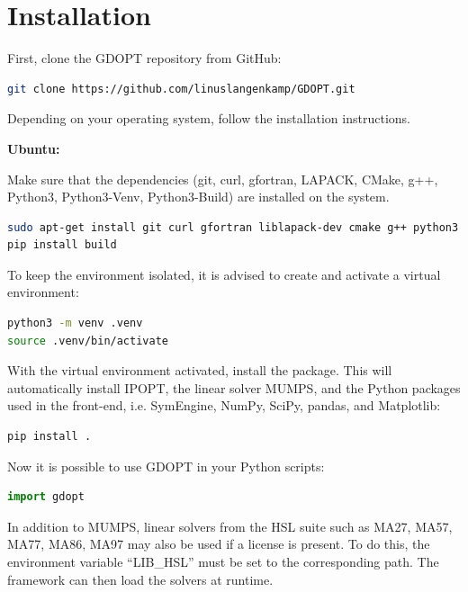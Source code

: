 \documentclass[12pt]{article}
\begin{document}
\section{Installation}

First, clone the GDOPT repository from GitHub:

\begin{lstlisting}[language=bash]
git clone https://github.com/linuslangenkamp/GDOPT.git
\end{lstlisting}

Depending on your operating system, follow the installation instructions.

\begin{mdframed}[backgroundcolor=gray!10, roundcorner=10pt,
		linewidth=1pt]

	\textbf{Ubuntu:}

	Make sure that the dependencies (git, curl, gfortran, LAPACK, CMake, g++,
	Python3, Python3-Venv, Python3-Build) are installed on the system.

	\begin{lstlisting}[language=bash]
sudo apt-get install git curl gfortran liblapack-dev cmake g++ python3 python3-venv
pip install build
\end{lstlisting}

	To keep the environment isolated, it is advised to create and activate a
	virtual environment:

	\begin{lstlisting}[language=bash]
python3 -m venv .venv
source .venv/bin/activate
\end{lstlisting}

	With the virtual environment activated, install the package. This will
	automatically install
	IPOPT\cite{wachter2006implementation}, the linear solver
	MUMPS\cite{amestoy2001fully}, and the Python packages used in the front-end,
	i.e. SymEngine\cite{symengine}, NumPy\cite{harris2020array},
	SciPy\cite{virtanen2020scipy}, pandas\cite{mckinney2010data}, and
	Matplotlib\cite{hunter2007matplotlib}:

	\begin{lstlisting}[language=bash]
pip install .
\end{lstlisting}
\end{mdframed}

Now it is possible to use GDOPT in your Python scripts:
\begin{lstlisting}[language=python]
import gdopt
\end{lstlisting}
In addition to MUMPS, linear solvers from the HSL suite such as MA27, MA57,
MA77, MA86, MA97\cite{hsl2013collection} may also be used if a license is
present. To do this, the environment variable “LIB\_HSL” must be set to the
corresponding path. The framework can then load the solvers at runtime.
\end{document}
